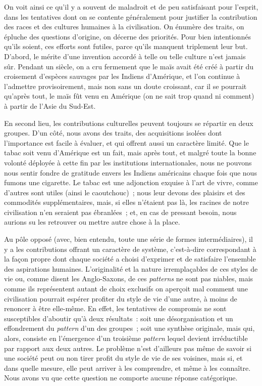 \documentclass[french,twoside]{book} %
\begin{document}
On voit ainsi ce qu’il y a souvent de maladroit et de peu satisfaisant pour l’esprit, dans les tentatives dont on se contente généralement pour justifier la contribution des races et des cultures humaines à la civilisation. On énumère des traits, on épluche des questions d’origine, on décerne des priorités. Pour bien intentionnés qu’ils soient, ces efforts sont futiles, parce qu’ils manquent triplement leur but. D’abord, le mérite d’une invention accordé à telle ou telle culture n’est jamais sûr. Pendant un siècle, on a cru fermement que le maïs avait été créé à partir du croisement d’espèces sauvages par les Indiens d’Amérique, et l’on continue à l’admettre provisoirement, mais non sans un doute croissant, car il se pourrait qu’après tout, le maïs fût venu en Amérique (on ne sait trop quand ni comment) à partir de l’Asie du Sud-Est.\par
En second lieu, les contributions culturelles peuvent toujours se répartir en deux groupes. D’un côté, nous avons des traits, des acquisitions isolées dont l’importance est facile à évaluer, et qui offrent aussi un caractère limité. Que le tabac soit venu d’Amérique est un fait, mais après tout, et malgré toute la bonne volonté déployée à cette fin par les institutions internationales, nous ne pouvons nous sentir fondre de gratitude envers les Indiens américains chaque fois que nous fumons une cigarette. Le tabac est une adjonction exquise à l’art de vivre, comme d’autres sont utiles (ainsi le caoutchouc) ; nous leur devons des plaisirs et des commodités supplémentaires, mais, si elles n’étaient pas là, les racines de notre civilisation n’en seraient pas ébranlées ; et, en cas de pressant besoin, nous aurions su les retrouver ou mettre autre chose à la place.\par
Au pôle opposé (avec, bien entendu, toute une série de formes intermédiaires), il y a les contributions offrant un caractère de système, c’est-à-dire correspondant à la façon propre dont chaque société a choisi d’exprimer et de satisfaire l’ensemble des aspirations humaines. L’originalité et la nature irremplaçables de ces styles de vie ou, comme disent les Anglo-Saxons, de ces \emph{patterns} ne sont pas niables, mais comme ils représentent autant de choix exclusifs on aperçoit mal comment une civilisation pourrait espérer profiter du style de vie d’une autre, à moins de renoncer à être elle-même. En effet, les tentatives de compromis ne sont susceptibles d’aboutir qu’à deux résultats : soit une désorganisation et un effondrement du \emph{pattern} d’un des groupes ; soit une synthèse originale, mais qui, alors, consiste en l’émergence d’un troisième \emph{pattern} lequel devient irréductible par rapport aux deux autres. Le problème n’est d’ailleurs pas même de savoir si une société peut ou non tirer profit du style de vie de ses voisines, mais si, et dans quelle mesure, elle peut arriver à les comprendre, et même à les connaître. Nous avons vu que cette question ne comporte aucune réponse catégorique.\par
\end{document}
